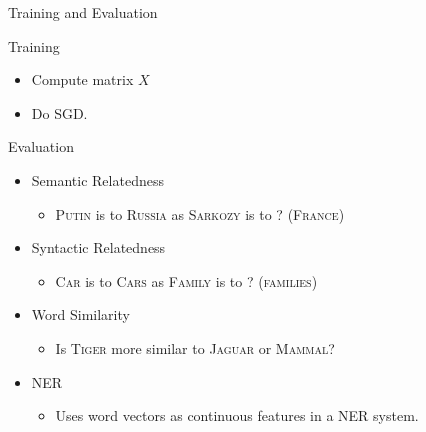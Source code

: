 
\begin{frame}{Training and Evaluation}

  \begin{exampleblock}{Training}
    \begin{itemize}[<+->]
    \item Compute matrix $X$
    \item Do SGD.
    \end{itemize}
  \end{exampleblock}
  
  \begin{exampleblock}{Evaluation}
    \begin{itemize}[<+->]
    \item Semantic Relatedness %
      \begin{itemize}
      \item \textsc{Putin} is to \textsc{Russia} as \textsc{Sarkozy} is to ? (\textsc{France})
      \end{itemize}
    \item Syntactic Relatedness %
      \begin{itemize}
      \item \textsc{Car} is to \textsc{Cars} as \textsc{Family} is to ? (\textsc{families})
      \end{itemize}
    \item Word Similarity
      \begin{itemize}
      \item Is \textsc{Tiger} more similar to \textsc{Jaguar} or \textsc{Mammal}?
        \end{itemize}
    \item NER 
      \begin{itemize}
      \item Uses word vectors as continuous features in a NER system.
      \end{itemize}
    \end{itemize}
  \end{exampleblock}
\end{frame}

